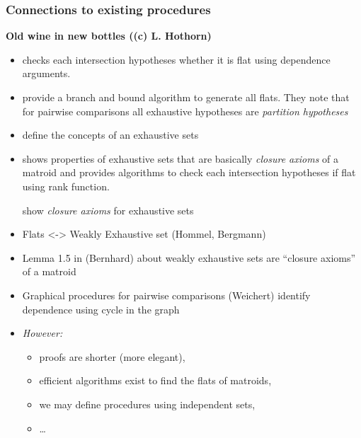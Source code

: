 \documentclass[bigger]{beamer}
\begin{document}
\begin{frame}
\frametitle{Connections to existing procedures}

\textbf{Old wine in new bottles ((c) L. Hothorn)}
\begin{itemize}
\item \cite{westfall1997multiple} checks each intersection hypotheses
  whether it is flat using dependence arguments.
\item \cite{westfall2007multiple} provide a branch and bound algorithm
  to generate all flats. They note that for pairwise comparisons all
  exhaustive hypotheses are {\em partition hypotheses} 
\item \cite{bergmann1988improvements} define the concepts of an
  exhaustive sets
\item \cite{bernhard1991computergestuetzte} shows properties of
  exhaustive sets that are basically {\em closure axioms} of a matroid
  and provides algorithms to check each intersection hypotheses if
  flat using rank function.

  \cite{hommel1999bonferroni} show {\em closure axioms} for exhaustive
  sets 
\item Flats <-> Weakly Exhaustive set (Hommel, Bergmann)

\item Lemma 1.5 in (Bernhard) about weakly exhaustive sets are ``closure axioms'' of a matroid

\item Graphical procedures for pairwise comparisons (Weichert) identify dependence using cycle in the graph


\item \emph{However:}
\begin{itemize}
\item proofs are shorter (more elegant),
\item efficient algorithms exist to find the flats of matroids,
\item we may define procedures using independent sets,
\item \ldots{}
\end{itemize}

\end{itemize} %
\end{frame}
\end{document}
